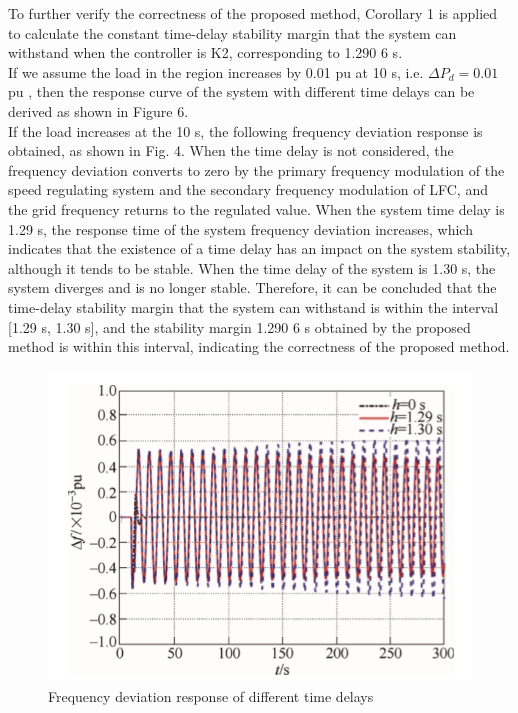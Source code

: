 \documentclass[journal]{IEEEtran}
\begin{document}
To further verify the correctness of the proposed method, Corollary 1 is applied to calculate the constant time-delay stability margin that the system can withstand when the controller is K2, corresponding to 1.290 6 s. \\
If we assume the load in the region increases by 0.01 pu at 10 s, i.e. $\Delta P_d = 0.01$ pu , then the response curve of the system with different time delays can be derived as shown in Figure 6. \\
If the load increases at the 10 s, the following frequency deviation response is obtained, as shown in Fig. 4. When the time delay is not considered, the frequency deviation converts to zero by the primary frequency modulation of the speed regulating system and the secondary frequency modulation of LFC, and the grid frequency returns to the regulated value. When the system time delay is 1.29 s, the response time of the system frequency deviation increases, which indicates that the existence of a time delay has an impact on the system stability, although it tends to be stable. When the time delay of the system is 1.30 s, the system diverges and is no longer stable. Therefore, it can be concluded that the time-delay stability margin that the system can withstand is within the interval [1.29 s, 1.30 s], and the stability margin 1.290 6 s obtained by the proposed method is within this interval, indicating the correctness of the proposed method. \\ 
\begin{figure}[h!]
\includegraphics[width=\linewidth]{frequencydeviation.png}
  \caption{ Frequency deviation response of different time delays }
  \label{ Frequency deviation response of different time delays }
\end{figure}
\end{document}
